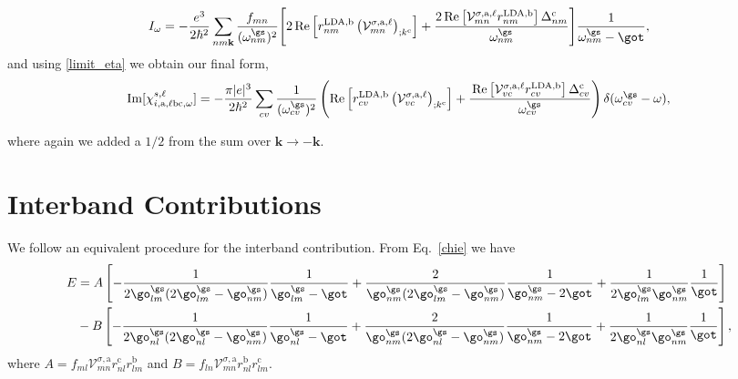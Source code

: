 \begin{equation}\label{wchii_simplified}
I_{\omega}
=   -\frac{e^3}{2\hbar^2}\sum_{nm\mathbf{k}}
    \frac{f_{mn}}{(\omega^{\gs}_{nm})^{2}}
\Biggl[
    2\,\mathrm{Re}\left[r^{\text{LDA,b}}_{nm}
    \left(\mathcal{V}^{\sigma,\text{a},\ell}_{mn}\right)_{;k^{\text{c}}}\right]
+   \frac{2\,\mathrm{Re}\left[\mathcal{V}^{\sigma,\text{a},\ell}_{mn}
    r^{\text{LDA,b}}_{nm}\right]\Delta^{\text{c}}_{nm}}{\omega^{\gs}_{nm}} 
\Biggr]\frac{1}{\omega^{\gs}_{nm}-\got}
,
\end{equation}
and using \eqref{limit_eta} we obtain our final form,
\begin{equation}
\mathrm{Im}[\chi_{i,\text{a},\ell\text{b}\text{c},\omega}^{s,\ell}]
=   -\frac{\pi\vert e\vert^3}{2\hbar^2}
    \sum_{cv}\frac{1}{(\omega^{\gs}_{cv})^{2}}
\left(
    \mathrm{Re}\left[r^{\text{LDA,b}}_{cv}
    \left(\mathcal{V}^{\sigma,\text{a},\ell}_{vc}\right)_{;k^{\text{c}}}\right]
+   \frac{\,\mathrm{Re}\left[\mathcal{V}^{\sigma,\text{a},\ell}_{vc}
    r^{\text{LDA,b}}_{cv}\right]\Delta^{\text{c}}_{cv}}{\omega^{\gs}_{cv}} 
\right)\delta(\omega^{\gs}_{cv}-\omega)
,
\end{equation}

where again we added a $1/2$ from the sum over 
$\mathbf{k} \rightarrow - \mathbf{k}$.

\section{Interband Contributions}

We follow an equivalent procedure for the interband contribution. 
From Eq.~\eqref{chie} we have
\begin{align}\label{ewithaandb}  
E&=  
A
\left[
-\frac{1}{2\go^\gs_{lm}(2\go^\gs_{lm}-\go^\gs_{nm})}\frac{1}{\go^\gs_{lm}-\got}
+\frac{2}{\go^\gs_{nm}(2\go^\gs_{lm}-\go^\gs_{nm})}\frac{1}{\go^\gs_{nm}-2\got}
+\frac{1}{2\go^\gs_{lm}\go^\gs_{nm}}\frac{1}{\got}
\right]
\nonumber\\
&- 
B
\left[
-\frac{1}{2\go^\gs_{nl}(2\go^\gs_{nl}-\go^\gs_{nm})}\frac{1}{\go^\gs_{nl}-\got}
+\frac{2}{\go^\gs_{nm}(2\go^\gs_{nl}-\go^\gs_{nm})}\frac{1}{\go^\gs_{nm}-2\got}
+\frac{1}{2\go^\gs_{nl}\go^\gs_{nm}}\frac{1}{\got}
\right]
,
\end{align}  
where 
$A=f_{ml}\mathcal{V}^{\sigma,\text{a}}_{mn}r^{\text{c}}_{nl}r^{\text{b}}_{lm}$   
and
$B=f_{ln}\mathcal{V}^{\sigma,\text{a}}_{mn}r^{\text{b}}_{nl}r^{\text{c}}_{lm}$.

